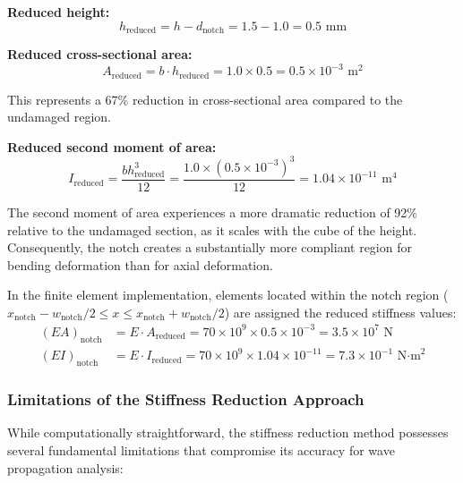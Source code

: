 \documentclass[12pt,a4paper]{report}
\begin{document}
\textbf{Reduced height:}
\begin{equation}
h_{\text{reduced}} = h - d_{\text{notch}} = 1.5 - 1.0 = 0.5 \text{ mm}
\end{equation}

\textbf{Reduced cross-sectional area:}
\begin{equation}
A_{\text{reduced}} = b \cdot h_{\text{reduced}} = 1.0 \times 0.5 = 0.5 \times 10^{-3} \text{ m}^2
\end{equation}

This represents a 67\% reduction in cross-sectional area compared to the undamaged region.

\textbf{Reduced second moment of area:}
\begin{equation}
I_{\text{reduced}} = \frac{b h_{\text{reduced}}^3}{12} = \frac{1.0 \times (0.5 \times 10^{-3})^3}{12} = 1.04 \times 10^{-11} \text{ m}^4
\end{equation}

The second moment of area experiences a more dramatic reduction of 92\% relative to the undamaged section, as it scales with the cube of the height. Consequently, the notch creates a substantially more compliant region for bending deformation than for axial deformation.

In the finite element implementation, elements located within the notch region ($x_{\text{notch}} - w_{\text{notch}}/2 \leq x \leq x_{\text{notch}} + w_{\text{notch}}/2$) are assigned the reduced stiffness values:
\begin{align}
(EA)_{\text{notch}} &= E \cdot A_{\text{reduced}} = 70 \times 10^9 \times 0.5 \times 10^{-3} = 3.5 \times 10^7 \text{ N} \\
(EI)_{\text{notch}} &= E \cdot I_{\text{reduced}} = 70 \times 10^9 \times 1.04 \times 10^{-11} = 7.3 \times 10^{-1} \text{ N·m}^2
\end{align}

\subsubsection{Limitations of the Stiffness Reduction Approach}

While computationally straightforward, the stiffness reduction method possesses several fundamental limitations that compromise its accuracy for wave propagation analysis:
\end{document}

